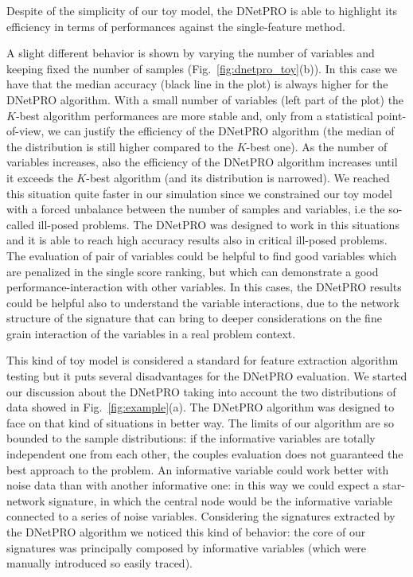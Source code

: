 \documentclass{standalone}
\begin{document}
Despite of the simplicity of our toy model, the DNetPRO is able to highlight its efficiency in terms of performances against the single-feature method.

A slight different behavior is shown by varying the number of variables and keeping fixed the number of samples (Fig.~\ref{fig:dnetpro_toy}(b)).
In this case we have that the median accuracy (black line in the plot) is always higher for the DNetPRO algorithm.
With a small number of variables (left part of the plot) the $K$-best algorithm performances are more stable and, only from a statistical point-of-view, we can justify the efficiency of the DNetPRO algorithm (the median of the distribution is still higher compared to the $K$-best one).
As the number of variables increases, also the efficiency of the DNetPRO algorithm increases until it exceeds the $K$-best algorithm (and its distribution is narrowed).
We reached this situation quite faster in our simulation since we constrained our toy model with a forced unbalance between the number of samples and variables, i.e the so-called ill-posed problems.
The DNetPRO was designed to work in this situations and it is able to reach high accuracy results also in critical ill-posed problems.
The evaluation of pair of variables could be helpful to find good variables which are penalized in the single score ranking, but which can demonstrate a good performance-interaction with other variables.
In this cases, the DNetPRO results could be helpful also to understand the variable interactions, due to the network structure of the signature that can bring to deeper considerations on the fine grain interaction of the variables in a real problem context.

This kind of toy model is considered a standard for feature extraction algorithm testing but it puts several disadvantages for the DNetPRO evaluation.
We started our discussion about the DNetPRO taking into account the two distributions of data showed in Fig.~\ref{fig:example}(a).
The DNetPRO algorithm was designed to face on that kind of situations in better way.
The limits of our algorithm are so bounded to the sample distributions: if the informative variables are totally independent one from each other, the couples evaluation does not guaranteed the best approach to the problem.
An informative variable could work better with noise data than with another informative one: in this way we could expect a star-network signature, in which the central node would be the informative variable connected to a series of noise variables.
Considering the signatures extracted by the DNetPRO algorithm we noticed this kind of behavior: the core of our signatures was principally composed by informative variables (which were manually introduced so easily traced).
\end{document}
